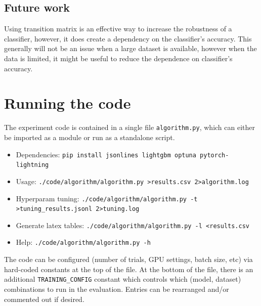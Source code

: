 \documentclass{article} %
\begin{document}
\subsection{Future work}
Using transition matrix is an effective way to increase the robustness of a classifier, however, it does create a dependency on the classifier’s accuracy. This generally will not be an issue when a large dataset is available, however when the data is limited, it might be useful to reduce the dependence on classifier's accuracy.


\pagebreak\printbibliography\appendix

\section{Running the code}
The experiment code is contained in a single file \texttt{algorithm.py}, which can either be imported as a module or run as a standalone script.

\begin{itemize}
\item Dependencies: \texttt{pip install jsonlines lightgbm optuna pytorch-lightning}
\item Usage: \texttt{./code/algorithm/algorithm.py >results.csv 2>algorithm.log}
\item Hyperparam tuning: \texttt{./code/algorithm/algorithm.py -t >tuning\_results.jsonl 2>tuning.log}
\item Generate latex tables: \texttt{./code/algorithm/algorithm.py -l <results.csv}
\item Help: \texttt{./code/algorithm/algorithm.py -h}
\end{itemize}

The code can be configured (number of trials, GPU settings, batch size, etc) via hard-coded constants at the top of the file. At the bottom of the file, there is an additional \texttt{TRAINING\_CONFIG} constant which controls which (model, dataset) combinations to run in the evaluation. Entries can be rearranged and/or commented out if desired.
\end{document}
